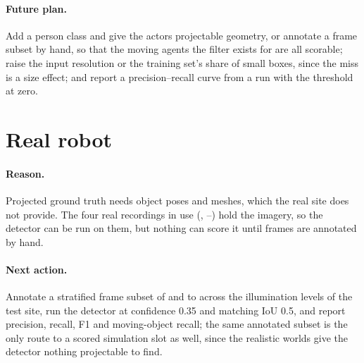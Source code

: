 \documentclass[11pt,a4paper,notitlepage]{report}
\begin{document}
\paragraph{Future plan.} Add a person class and give the actors projectable
geometry, or annotate a frame subset by hand, so that the moving agents the
filter exists for are all scorable; raise the input resolution or the
training set's share of small boxes, since the miss is a size effect; and
report a precision--recall curve from a run with the threshold at zero.

\FloatBarrier
\section{Real robot}
\label{sec:exp2-real}


\paragraph{Reason.} Projected ground truth needs object poses and meshes,
which the real site does not provide. The four real recordings in use
(, --) hold the imagery, so the
detector can be run on them, but nothing can score it until frames are
annotated by hand.

\paragraph{Next action.} Annotate a stratified frame subset of
 and  to  across
the illumination levels of the test site, run the detector at confidence 0.35
and matching IoU 0.5, and report precision, recall, F1 and moving-object
recall; the same annotated subset is the only route to a scored simulation
slot as well, since the realistic worlds give the detector nothing projectable
to find.
\end{document}
